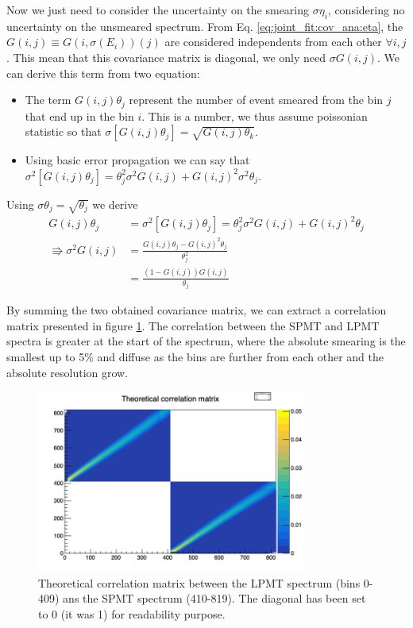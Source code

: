 \documentclass[../main.tex]{subfiles}
\begin{document}
Now we just need to consider the uncertainty on the smearing $\sigma \eta_i$, considering no uncertainty on the unsmeared spectrum. From Eq. \ref{eq:joint_fit:cov_ana:eta}, the $G(i, j) \equiv G(i, \sigma(E_i))(j)$ are considered independents from each other $\forall i, j$. This mean that this covariance matrix is diagonal, we only need $\sigma G(i, j)$. We can derive this term from two equation:
\begin{itemize}
  \item The term $G(i, j)\theta_j$ represent the number of event smeared from the bin $j$ that end up in the bin $i$. This is a number, we thus assume poissonian statistic so that $\sigma[G(i, j)\theta_j] = \sqrt{G(i, j) \theta_k}$.
  \item Using basic error propagation we can say that $\sigma^2[G(i, j)\theta_j] =\theta_j^2 \sigma^2G(i, j) + G(i, j)^2 \sigma^2 \theta_j$.
\end{itemize}
Using $\sigma\theta_j = \sqrt{\theta_j}$ we derive
\begin{align}
  G(i, j) \theta_j &= \sigma^2[G(i, j)\theta_j] =\theta_j^2 \sigma^2G(i, j) + G(i, j)^2 \theta_j \\
  \Rrightarrow \sigma^2 G(i, j) &= \frac{G(i, j) \theta_j - G(i, j)^2 \theta_j}{\theta_j^2} \\
                                &= \frac{(1 - G(i, j))G(i, j)}{\theta_j}
\end{align}

By summing the two obtained covariance matrix, we can extract a correlation matrix presented in figure \ref{fig:joint_fit:th_cor_mat}. The correlation between the SPMT and LPMT spectra is greater at the start of the spectrum, where the absolute smearing is the smallest up to 5\% and diffuse as the bins are further from each other and the absolute resolution grow.

\begin{figure}[ht]
  \centering
  \includegraphics[height=6cm]{images/joint_fit/theoretical_corr.png}
  \caption{Theoretical correlation matrix between the LPMT spectrum (bins 0-409) ans the SPMT spectrum (410-819). The diagonal has been set to 0 (it was 1) for readability purpose.}
  \label{fig:joint_fit:th_cor_mat}
\end{figure}
\end{document}
